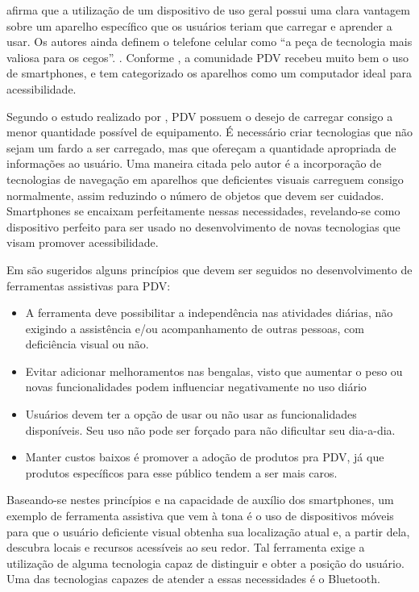 \documentclass[english,brazilian]{UNISINOSmonografia}
\begin{document}
 afirma que a utilização de um dispositivo de uso geral possui uma clara vantagem sobre um aparelho específico que os usuários teriam que carregar e aprender a usar. Os autores ainda definem o telefone celular como “a peça de tecnologia mais valiosa para os cegos”. \cite{mau2008blindaid}. Conforme , a comunidade PDV recebeu muito bem o uso de smartphones, e tem categorizado os aparelhos como um computador ideal para acessibilidade.

Segundo o estudo realizado por , PDV possuem o desejo de carregar consigo a menor quantidade possível de equipamento. É necessário criar tecnologias que não sejam um fardo a ser carregado, mas que ofereçam a quantidade apropriada de informações ao usuário. Uma maneira citada pelo autor é a incorporação de tecnologias de navegação em aparelhos que deficientes visuais carreguem consigo normalmente, assim reduzindo o número de objetos que devem ser cuidados. Smartphones se encaixam perfeitamente nessas necessidades, revelando-se como dispositivo perfeito para ser usado no desenvolvimento de novas tecnologias que visam promover acessibilidade.

Em  são sugeridos alguns princípios que devem ser seguidos no desenvolvimento de ferramentas assistivas para PDV:
\begin{itemize}
	\item A ferramenta deve possibilitar a independência nas atividades diárias, não exigindo a assistência e/ou acompanhamento de outras pessoas, com deficiência visual ou não.
	\item Evitar adicionar melhoramentos nas bengalas, visto que aumentar o peso ou novas funcionalidades podem influenciar negativamente no uso diário
	\item Usuários devem ter a opção de usar ou não usar as funcionalidades disponíveis. Seu uso não pode ser forçado para não dificultar seu dia-a-dia.
	\item Manter custos baixos é promover a adoção de produtos pra PDV, já que produtos específicos para esse público tendem a ser mais caros.
\end{itemize}

Baseando-se nestes princípios e na capacidade de auxílio dos smartphones, um exemplo de ferramenta assistiva que vem à tona é o uso de dispositivos móveis para que o usuário deficiente visual obtenha sua localização atual e, a partir dela, descubra locais e recursos acessíveis ao seu redor. Tal ferramenta exige a utilização de alguma tecnologia capaz de distinguir e obter a posição do usuário. Uma das tecnologias capazes de atender a essas necessidades é o Bluetooth.
\end{document}
